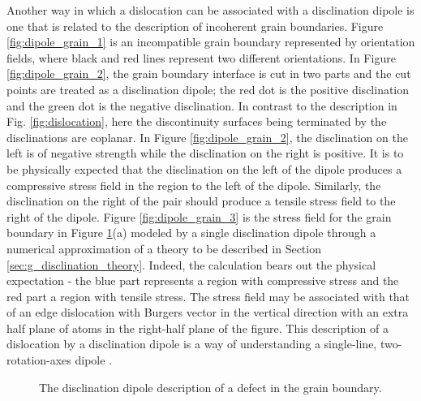 \documentclass[11pt,letterpaper]{article}
\begin{document}
Another way in which a dislocation can be associated with a disclination dipole is one that is related to the description of incoherent grain boundaries. Figure \ref{fig:dipole_grain_1} is an incompatible grain boundary represented by orientation fields, where black and red lines represent two different orientations. In Figure \ref{fig:dipole_grain_2},  the grain boundary interface is cut in two parts and the cut points are treated as a disclination dipole; the red dot is the positive disclination and the green dot is the negative disclination. In contrast to the description in Fig. \ref{fig:dislocation}, here the discontinuity surfaces being terminated by the disclinations are coplanar. In Figure \ref{fig:dipole_grain_2}, the disclination on the left is of negative strength while the disclination on the right is positive. It is to be physically expected  that the disclination on the left of the dipole produces a compressive stress field in the region to the left of the dipole. Similarly, the disclination on the right of the pair should produce a tensile stress field to the right of the dipole. Figure \ref{fig:dipole_grain_3} is the stress field for the grain boundary in Figure \ref{fig:grain_boundary}(a) modeled by a single disclination dipole through a numerical approximation of a theory to be described in Section \ref{sec:g_disclination_theory}. Indeed, the calculation bears out the physical expectation - the blue part represents a region with compressive stress and the red part a region with tensile stress. The stress field may be associated with that of an edge dislocation with Burgers vector in the vertical direction with an extra half plane of atoms in the right-half plane of the figure.  This description of a dislocation by a disclination dipole is a way of understanding a single-line, two-rotation-axes dipole \cite{romanov2009application}.


\begin {figure}
\centering
{} \qquad
{}
\caption{The disclination dipole description of a defect in the grain boundary.}
\label{fig:grain_boundary}
\end {figure}
\end{document}
